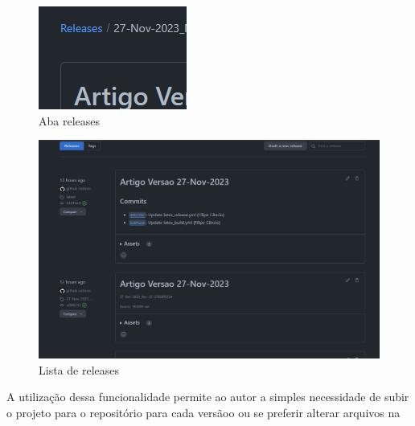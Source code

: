 \begin{figure}[ht]
	\centering
	\includegraphics[width=.5\textwidth]{./images/image08.png}
	\caption{Aba releases}
	\label{fig:image08}
\end{figure}


\begin{figure}[ht]
	\centering
	\includegraphics[width=.5\textwidth]{./images/image09.png}
	\caption{Lista de releases}
	\label{fig:image09}
\end{figure}

A utilização dessa funcionalidade permite ao autor a simples necessidade de subir o projeto para o repositório para cada versãoo ou se preferir alterar arquivos na 
